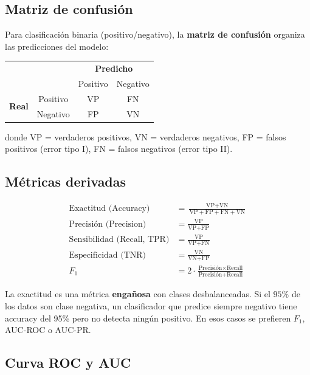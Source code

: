 \documentclass[12pt, a4paper]{article}
\theoremstyle{definition}
\theoremstyle{plain}
\theoremstyle{remark}
\begin{document}
\subsection{Matriz de confusión}

Para clasificación binaria (positivo/negativo), la \textbf{matriz de confusión} organiza las predicciones del modelo:

\begin{center}
\begin{tabular}{cc|cc}
  & & \multicolumn{2}{c}{\textbf{Predicho}} \\
  & & Positivo & Negativo \\
  \hline
  \multirow{2}{*}{\textbf{Real}} & Positivo & VP & FN \\
  & Negativo & FP & VN \\
\end{tabular}
\end{center}

donde VP = verdaderos positivos, VN = verdaderos negativos, FP = falsos positivos (error tipo I), FN = falsos negativos (error tipo II).

\subsection{Métricas derivadas}

\begin{align}
  \text{Exactitud (Accuracy)} &= \frac{\text{VP} + \text{VN}}{\text{VP}+\text{FP}+\text{FN}+\text{VN}} \\[6pt]
  \text{Precisión (Precision)} &= \frac{\text{VP}}{\text{VP}+\text{FP}} \\[6pt]
  \text{Sensibilidad (Recall, TPR)} &= \frac{\text{VP}}{\text{VP}+\text{FN}} \\[6pt]
  \text{Especificidad (TNR)} &= \frac{\text{VN}}{\text{VN}+\text{FP}} \\[6pt]
  F_1 &= 2 \cdot \frac{\text{Precisión} \times \text{Recall}}{\text{Precisión} + \text{Recall}}
\end{align}

\begin{alerta}
  La exactitud es una métrica \textbf{engañosa} con clases desbalanceadas. Si el $95\%$ de los datos son clase negativa, un clasificador que predice siempre negativo tiene accuracy del 95\% pero no detecta ningún positivo. En esos casos se prefieren $F_1$, AUC-ROC o AUC-PR.
\end{alerta}

\subsection{Curva ROC y AUC}
\end{document}
